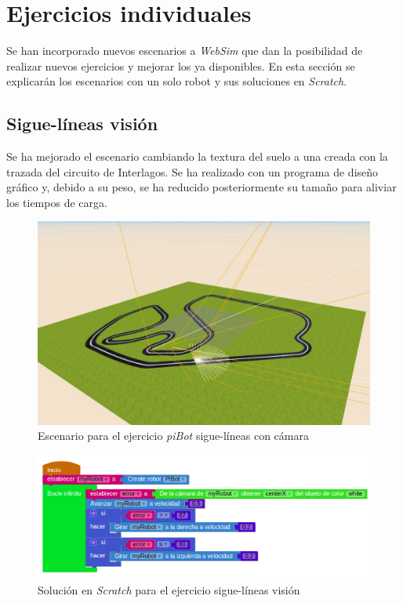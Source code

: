 \section{Ejercicios individuales}
\label{sec:escenarios}

Se han incorporado nuevos escenarios a \textit{WebSim} que dan la posibilidad de realizar nuevos ejercicios y  mejorar los ya disponibles. En esta sección se explicarán los escenarios con un solo robot y sus soluciones en \textit{Scratch}.

\subsection{Sigue-líneas visión}
    Se ha mejorado el escenario cambiando la textura del suelo a una creada con la trazada del circuito de Interlagos. Se ha realizado con un programa de diseño gráfico y, debido a su peso, se ha reducido posteriormente su tamaño para aliviar los tiempos de carga. 
    
    \begin{figure}[H]
    \centering
    \includegraphics[scale=0.4]{img/pibot_vision.JPG}
    \caption{Escenario para el ejercicio \textit{piBot} sigue-líneas con cámara} \label{fig:siguelineavision}
    \end{figure}
    
        \begin{figure}[H]
    \centering
    \includegraphics[scale=0.5]{img/siguelineasvisioncodigo.png}
    \caption{Solución en \textit{Scratch} para el ejercicio sigue-líneas visión} 
    \label{fig:visionSolution}
    \end{figure}
    
